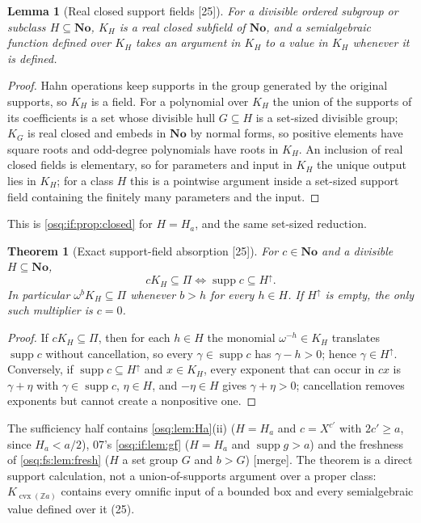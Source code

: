 \documentclass[11pt,letterpaper]{article}
\numberwithin{equation}{section}
\newtheorem{theorem}{Theorem}[section]
\newtheorem{lemma}[lemma]{Lemma}
\theoremstyle{definition}
\theoremstyle{remark}
\theoremstyle{plain}
\newcommand{\No}{\mathbf{No}}
\newcommand{\Z}{\mathbb Z}
\newcommand{\supp}{\operatorname{supp}}
\newcommand{\src}[1]{\textup{\textsf{[#1]}}}
\newcommand{\merge}{\textup{\textsf{[merge]}}}
\begin{document}
\begin{lemma}[Real closed support fields \src{25}]\label{osq:sa:lem:KH}
For a divisible ordered subgroup or subclass $H\subseteq\No$, $K_H$ is a real closed subfield of $\No$, and a semialgebraic function defined over $K_H$
takes an argument in $K_H$ to a value in $K_H$ whenever it is defined.
\end{lemma}
\begin{proof}
Hahn operations keep supports in the group generated by the original supports, so $K_H$ is a field. For a polynomial over $K_H$ the union of the supports
of its coefficients is a set whose divisible hull $G\subseteq H$ is a set-sized divisible group; $K_G$ is real closed \cite{LM} and embeds in $\No$ by normal
forms, so positive elements have square roots and odd-degree polynomials have roots in $K_H$. An inclusion of real closed fields is elementary, so for
parameters and input in $K_H$ the unique output lies in $K_H$; for a class $H$ this is a pointwise argument inside a set-sized support field containing the
finitely many parameters and the input.
\end{proof}

This is \cref{osq:if:prop:closed} for $H=H_a$, and the same set-sized reduction.

\begin{theorem}[Exact support-field absorption \src{25}]\label{osq:sa:thm:absorption}
For $c\in\No$ and a divisible $H\subseteq\No$,
\begin{equation}\label{osq:sa:eq:absorption}
 cK_H\subseteq\Pi\iff\supp c\subseteq H^{\uparrow}.
\end{equation}
In particular $\omega^bK_H\subseteq\Pi$ whenever $b>h$ for every $h\in H$. If $H^{\uparrow}$ is empty, the only such multiplier is $c=0$.
\end{theorem}
\begin{proof}
If $cK_H\subseteq\Pi$, then for each $h\in H$ the monomial $\omega^{-h}\in K_H$ translates $\supp c$ without cancellation, so every $\gamma\in\supp c$ has
$\gamma-h>0$; hence $\gamma\in H^{\uparrow}$. Conversely, if $\supp c\subseteq H^{\uparrow}$ and $x\in K_H$, every exponent that can occur in $cx$ is
$\gamma+\eta$ with $\gamma\in\supp c$, $\eta\in H$, and $-\eta\in H$ gives $\gamma+\eta>0$; cancellation removes exponents but cannot create a nonpositive
one.
\end{proof}

The sufficiency half contains \cref{osq:lem:Ha}(ii) ($H=H_a$ and $c=X^{c'}$ with $2c'\ge a$, since $H_a<a/2$), 07's \cref{osq:if:lem:gf} ($H=H_a$ and
$\supp g>a$) and the freshness of \cref{osq:fs:lem:fresh} ($H$ a set group $G$ and $b>G$) \merge. The theorem is a direct support calculation, not a
union-of-supports argument over a proper class: $K_{\operatorname{cvx}(\Z a)}$ contains every omnific input of a bounded box and every semialgebraic value
defined over it (25).
\end{document}
